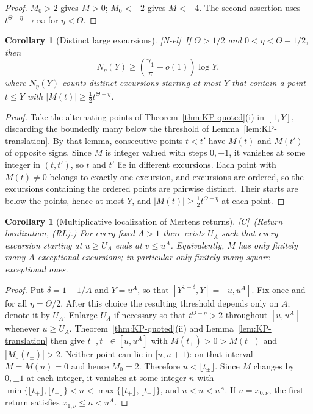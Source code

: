 \documentclass[11pt]{amsart}
\numberwithin{equation}{section}
\theoremstyle{plain}
\newtheorem{corollary}[theorem]{Corollary}
\theoremstyle{definition}
\theoremstyle{remark}
\newcommand{\tagNE}{\textup{[N-el]}}
\newcommand{\tagC}{\textup{[C]}}
\begin{document}
\begin{proof}
$M_0>2$ gives $M>0$; $M_0<-2$ gives $M<-4$. The second assertion uses
$t^{\Theta-\eta}\to\infty$ for $\eta<\Theta$.
\end{proof}

\begin{corollary}[Distinct large excursions]
\label{cor:KP-large-excursions}
\tagNE\ If $\Theta>1/2$ and $0<\eta<\Theta-1/2$, then
\begin{equation}
\label{eq:KP-large-excursions}
N_\eta(Y)\ge\left(\frac{\gamma_1}{\pi}-o(1)\right)\log Y,
\end{equation}
where $N_\eta(Y)$ counts distinct excursions starting at most $Y$ that
contain a point $t\le Y$ with $|M(t)|\ge\tfrac12 t^{\Theta-\eta}$.
\end{corollary}

\begin{proof}
Take the alternating points of Theorem~\ref{thm:KP-quoted}(i) in $[1,Y]$,
discarding the boundedly many below the threshold of
Lemma~\ref{lem:KP-translation}. By that lemma, consecutive points $t<t'$
have $M(t)$ and $M(t')$ of opposite signs. Since $M$ is integer valued with
steps $0,\pm1$, it vanishes at some integer in $(t,t')$, so $t$ and $t'$ lie
in different excursions. Each point with $M(t)\ne0$ belongs to exactly one
excursion, and excursions are ordered, so the excursions containing the
ordered points are pairwise distinct. Their starts are below the points,
hence at most $Y$, and $|M(t)|\ge\frac12t^{\Theta-\eta}$ at each point.
\end{proof}

\begin{corollary}[Multiplicative localization of Mertens returns]
\label{cor:KP-local-returns}
\tagC\ \textup{(Return localization, (RL).)} For every fixed $A>1$ there exists $U_A$ such that every excursion starting
at $u\ge U_A$ ends at $v\le u^A$. Equivalently, $M$ has only finitely many
$A$-exceptional excursions; in particular only finitely many
square-exceptional ones.
\end{corollary}

\begin{proof}
Put $\delta=1-1/A$ and $Y=u^A$, so that
$[Y^{1-\delta},Y]=[u,u^A]$.  Fix once and for all
$\eta=\Theta/2$.  After this choice the resulting threshold depends only
on $A$; denote it by $U_A$.  Enlarge $U_A$ if necessary so that
$t^{\Theta-\eta}>2$ throughout $[u,u^A]$ whenever $u\ge U_A$.
Theorem~\ref{thm:KP-quoted}(ii) and Lemma~\ref{lem:KP-translation} then give
$t_+,t_-\in[u,u^A]$ with $M(t_+)>0>M(t_-)$ and
$|M_0(t_\pm)|>2$.  Neither point can lie in $[u,u+1)$: on that interval
$M=M(u)=0$ and hence $M_0=2$.  Therefore $u<\lfloor t_\pm\rfloor$. Since $M$ changes by
$0,\pm1$ at each integer, it vanishes at some integer $n$ with
$\min\{\lfloor t_+\rfloor,\lfloor t_-\rfloor\}<n<\max\{\lfloor t_+\rfloor,\lfloor t_-\rfloor\}$, and $u<n<u^A$. If
$u=x_{0,\nu}$, the first return satisfies $x_{1,\nu}\le n<u^A$.
\end{proof}
\end{document}
